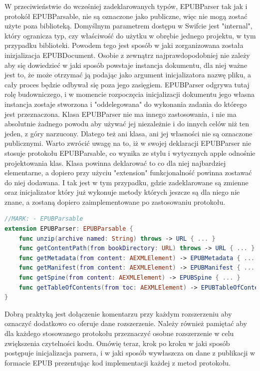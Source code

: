 W przeciwieństwie do wcześniej zadeklarowanych typów, EPUBParser tak jak i protokół EPUBParsable, nie są oznaczone jako publiczne, więc nie mogą zostać użyte poza biblioteką. Domyślnym parametrem dostępu w Swifcie jest "internal", który ogranicza typ, czy właściwość do użytku w obrębie jednego projektu, w tym przypadku biblioteki. Powodem tego jest sposób w jaki zorganizowana została inizjalizacja EPUBDocument. Osobie z zewnątrz najprawdopodobniej nie zależy aby się dowiedzieć w jaki sposób powstaje instancja dokumentu, dla niej ważne jest to, że może otrzymać ją podając jako argument inicjalizatora nazwę pliku, a cały proces będzie odbywał się poza jego zasięgiem. EPUBParser odgrywa tutaj rolę budowniczego, i w momencie rozpoczęcia inicjalizacji dokumentu jego własna instancja zostaje stworzona i "oddelegowana" do wykonania zadania do którego jest przeznaczona. Klasa EPUBParser nie ma innego zastosowania, i nie ma absolutnie żadnego powodu aby używać jej niezależnie i do innych celów niż ten jeden, z góry narzucony. Dlatego też ani klasa, ani jej własności nie są oznaczone publicznymi. Warto zwrócić uwagę na to, iż w swojej deklaracji EPUBParser nie stosuje protokołu EPUBParsable, co wynika ze stylu i wytycznych apple odnośnie projektowania klas. Klasa powinna deklarować to co dla niej najbardziej elementarne, a dopiero przy użyciu "extension" funkcjonalność powinna zostawać do niej dodawana. I tak jest w tym przypadku, gdzie zadeklarowane są zmienne oraz inicjalizator który już wykonuje metody których jeszcze są dla niego nie znane, a zostaną dopiero zaimplementowane po zastosowaniu protokołu.

\begin{lstlisting}[firstnumber=30,caption={Klasa EPUBParser stosuje protokół EPUBParsable.}, language=swift]
//MARK: - EPUBParsable
extension EPUBParser: EPUBParsable {
    func unzip(archive named: String) throws -> URL { ... }
    func getContentPath(from bookDirectory: URL) throws -> URL { ... }
    func getMetadata(from content: AEXMLElement) -> EPUBMetadata { ... }
    func getManifest(from content: AEXMLElement) -> EPUBManifest { ... }
    func getSpine(from content: AEXMLElement) -> EPUBSpine { ... }
    func getTableOfContents(from toc: AEXMLElement) -> EPUBTableOfContents { ... }
}
\end{lstlisting}

Dobrą praktyką jest dołączenie komentarzu przy każdym rozszerzeniu aby oznaczyć dodatkowo co oferuje dane rozszerzenie. Należy również pamiętać aby dla każdego stosowanego protokołu przeznaczyć osobne rozszerzenie w celu zwiększenia czytelności kodu. Omówię teraz, krok po kroku w jaki sposób postępuje inicjalizacja parsera, i w jaki sposób wywłaszcza on dane z publikacji w formacie EPUB prezentując kod implementacji każdej z metod protokołu.

